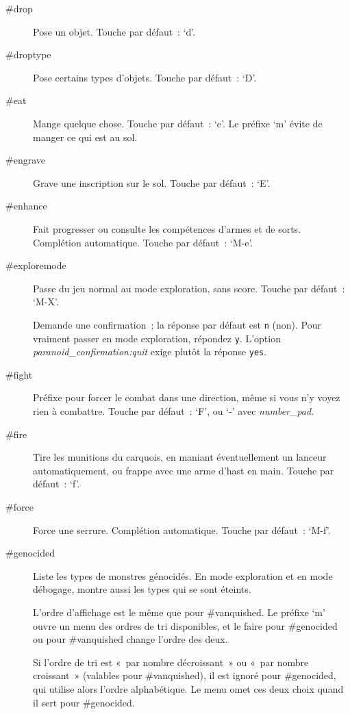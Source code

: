 \documentclass[titlepage]{article}
\begin{document}
\begin{description}
\item[{\#drop}]
Pose un objet.
Touche par défaut~: `d'.

\item[{\#droptype}]
Pose certains types d'objets.
Touche par défaut~: `D'.

\item[{\#eat}]
Mange quelque chose.
Touche par défaut~: `e'.
Le préfixe `m' évite de manger ce qui est au sol.

\item[{\#engrave}]
Grave une inscription sur le sol.
Touche par défaut~: `E'.

\item[{\#enhance}]
Fait progresser ou consulte les compétences d'armes et de sorts.
Complétion automatique.
Touche par défaut~: `M-e'.

\item[{\#exploremode}]
Passe du jeu normal au mode exploration, sans score.
Touche par défaut~: `M-X'.


Demande une confirmation~; la réponse par défaut est \texttt{n} (non).
Pour vraiment passer en mode exploration, répondez \texttt{y}.
L'option
\textit{paranoid\_confirmation:quit}
exige plutôt la réponse \texttt{yes}.

\item[{\#fight}]
Préfixe pour forcer le combat dans une direction, même si vous n'y voyez
rien à combattre.
Touche par défaut~: `F', ou `-' avec
\textit{number\_pad}.

\item[{\#fire}]
Tire les munitions du carquois, en maniant éventuellement un lanceur
automatiquement, ou frappe avec une arme d'hast en main.
Touche par défaut~: `f'.

\item[{\#force}]
Force une serrure.
Complétion automatique.
Touche par défaut~: `M-f'.

\item[{\#genocided}]
Liste les types de monstres génocidés.
En mode exploration et en mode débogage, montre aussi les types qui se
sont éteints.


L'ordre d'affichage est le même que pour \#vanquished.
Le préfixe `m' ouvre un menu des ordres de tri disponibles, et le
faire pour \#genocided ou pour \#vanquished change l'ordre des deux.


Si l'ordre de tri est «~par nombre décroissant~» ou «~par
nombre croissant~» (valables pour \#vanquished), il est ignoré pour
\#genocided, qui utilise alors l'ordre alphabétique.
Le menu omet ces deux choix quand il sert pour \#genocided.



\end{description}
\end{document}
